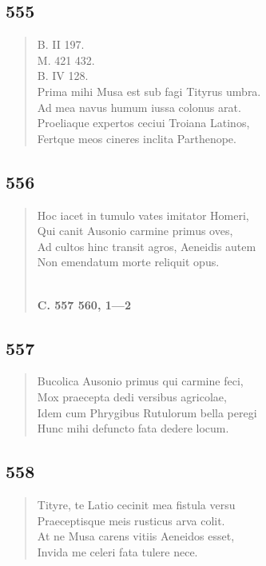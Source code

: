 \documentclass[11pt, a4paper]{report}
\begin{document}
            \subsection*{555}
      \begin{verse}
      B. II 197. \\ M. 421 432. \\ B. IV 128. \\ Prima mihi Musa est sub fagi Tityrus umbra. \\ Ad mea navus humum iussa colonus arat. \\ Proeliaque expertos ceciui Troiana Latinos, \\ Fertque meos cineres inclita Parthenope. \\ 
      \end{verse}
  
            \subsection*{556}
      \begin{verse}
      Hoc iacet in tumulo vates imitator Homeri, \\ Qui canit Ausonio carmine primus oves, \\ Ad cultos hinc transit agros, Aeneidis autem \\ Non emendatum morte reliquit opus. \\ 
        ﻿\pagebreak 
    \begin{center} \textbf{C. 557 560, 1—2} \end{center} \marginpar{[73]} 
      \end{verse}
  
            \subsection*{557}
      \begin{verse}
      Bucolica Ausonio primus qui carmine feci, \\ Mox praecepta dedi versibus agricolae, \\ Idem cum Phrygibus Rutulorum bella peregi \\ Hunc mihi defuncto fata dedere locum. \\ 
      \end{verse}
  
            \subsection*{558}
      \begin{verse}
      Tityre, te Latio cecinit mea fistula versu \\ Praeceptisque meis rusticus arva colit. \\ At ne Musa carens vitiis Aeneidos esset, \\ Invida me celeri fata tulere nece. \\ 
      \end{verse}
  
\end{document}
